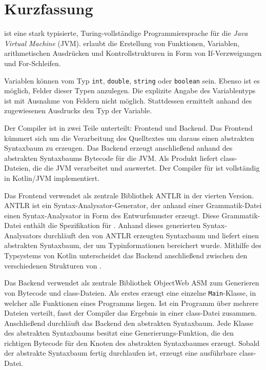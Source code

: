 \chapter{Kurzfassung}

\Toya ist eine stark typisierte, Turing-vollständige Programmiersprache für die \textit{Java Virtual Machine} (JVM). \Toya erlaubt die Erstellung von Funktionen, Variablen, arithmetischen Ausdrücken und Kontrollstrukturen in Form von If-Verzweigungen und For-Schleifen.

Variablen können vom Typ \texttt{int}, \texttt{double}, \texttt{string} oder \texttt{boolean} sein. Ebenso ist es möglich, Felder dieser Typen anzulegen. Die explizite Angabe des Variablentyps ist mit Ausnahme von Feldern nicht möglich. Stattdessen ermittelt \toya anhand des zugewiesenen Ausdrucks den Typ der Variable.

Der \toya Compiler ist in zwei Teile unterteilt: Frontend und Backend. Das Frontend kümmert sich um die Verarbeitung des Quelltextes um daraus einen abstrakten Syntaxbaum zu erzeugen. Das Backend erzeugt anschließend anhand des abstrakten Syntaxbaums Bytecode für die JVM. Als Produkt liefert \toya class-Dateien, die die JVM verarbeitet und auswertet. Der Compiler für \toya ist vollständig in Kotlin/JVM implementiert.

Das Frontend verwendet als zentrale Bibliothek ANTLR in der vierten Version. ANTLR ist ein Syntax-Analysator-Generator, der anhand einer Grammatik-Datei einen Syntax-Analysator in Form des \visitor Entwurfsmuster erzeugt. Diese Grammatik-Datei enthält die Spezifikation für \toya.
Anhand dieses generierten Syntax-Analysators durchläuft \toya den von ANTLR erzeugten Syntaxbaum und liefert einen abstrakten Syntaxbaum, der um Typinformationen bereichert wurde. Mithilfe des Typsystems von Kotlin unterscheidet das Backend anschließend zwischen den verschiedenen Strukturen von \toya.

Das Backend verwendet als zentrale Bibliothek ObjectWeb ASM zum Generieren von Bytecode und class-Dateien. Als erstes erzeugt \toya eine einzelne \texttt{Main}-Klasse, in welcher alle Funktionen eines \toya Programms liegen. Ist ein \toya Programm über mehrere Dateien verteilt, fasst der Compiler das Ergebnis in einer class-Datei zusammen. Anschließend durchläuft das Backend den abstrakten Syntaxbaum. Jede Klasse des abstrakten Syntaxbaums besitzt eine Generierungs-Funktion, die den richtigen Bytecode für den Knoten des abstrakten Syntaxbaumes erzeugt. Sobald der abstrakte Syntaxbaum fertig durchlaufen ist, erzeugt \toya eine ausführbare class-Datei.